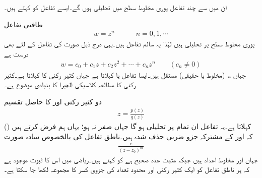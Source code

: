 ان میں سے چند تفاعل پوری مخلوط سطح میں تحلیلی ہوں گے۔ایسے تفاعل کو  کہتے ہیں۔ 

طاقتی تفاعل
\begin{align}
w=z^n\quad \quad \quad n=0,1,\cdots
\end{align}
پوری مخلوط سطح پر تحلیلی ہیں لہٰذا یہ سالم تفاعل ہیں۔یہی درج ذیل صورت کی تفاعل کے لئے بھی درست ہے
\begin{align}
w=c_0+c_1z+c_2z^2+\cdots+c_nz^n\quad \quad (c_n\ne 0)
\end{align}
جہاں ،، (مخلوط یا حقیقی) مستقل ہیں۔ایسا تفاعل  یا  کہلاتا ہے جہاں   کثیر رکنی کا  کہلاتا ہے۔کثیر رکنی کا مطالعہ کلاسیکی الجبرا کا بنیادی موضوع ہے۔

دو کثیر رکنی  اور  کا حاصل تقسیم
\begin{align}
z=\frac{p(z)}{q(z)}
\end{align}
()  کہلاتا ہے۔یہ تفاعل ان تمام  پر تحلیلی ہو گا جہاں  صفر نہ ہو؛ یہاں ہم فرض کرتے ہیں کہ  اور  کے مشترکہ جزو ضربی حذف شدہ ہیں۔ناطق تفاعل کی بالخصوص سادہ صورت
\begin{align}
\frac{c}{(z-z_0)^m}
\end{align}
جہاں  اور  مخلوط اعداد ہیں جبکہ  مثبت عدد صحیح ہے کو  کہتے ہیں۔ریاضی میں اس کا ثبوت موجود ہے کہ ہر ناطق تفاعل کو ایک کثیر رکنی اور محدود تعداد کی جزوی کسر کا مجموعہ لکھا جا سکتا ہے۔

